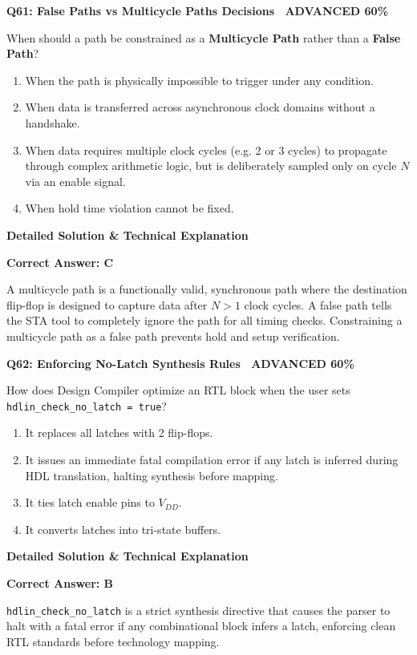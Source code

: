 \documentclass[11pt,a4paper]{article}
\newcommand{\badgeadv}{{\color{white}\colorbox{advred}{\bfseries\sffamily\tiny\ ADVANCED 60\%\ }}}
\newenvironment{qbox}[2]{%
  \begin{mdframed}[style=qstyle]%
  {\bfseries\sffamily\color{primaryblue}#1 \hfill #2}\par\vspace{2pt}%
}{%
  \end{mdframed}%
}
\newenvironment{ansbox}{%
  \begin{mdframed}[style=ansstyle]%
  {\bfseries\sffamily\color{ansgreen}\small Detailed Solution \& Technical Explanation}\par\vspace{2pt}\small%
}{%
  \end{mdframed}%
}
\begin{document}
\begin{qbox}{Q61: False Paths vs Multicycle Paths Decisions}{\badgeadv}
When should a path be constrained as a \textbf{Multicycle Path} rather than a \textbf{False Path}?
\begin{enumerate}[label=\textbf{\Alph*.}]
  \item When the path is physically impossible to trigger under any condition.
  \item When data is transferred across asynchronous clock domains without a handshake.
  \item When data requires multiple clock cycles (e.g. 2 or 3 cycles) to propagate through complex arithmetic logic, but is deliberately sampled only on cycle $N$ via an enable signal.
  \item When hold time violation cannot be fixed.
\end{enumerate}
\end{qbox}
\begin{ansbox}
\textbf{Correct Answer: C}

A multicycle path is a functionally valid, synchronous path where the destination flip-flop is designed to capture data after $N > 1$ clock cycles. A false path tells the STA tool to completely ignore the path for all timing checks. Constraining a multicycle path as a false path prevents hold and setup verification.
\end{ansbox}

\begin{qbox}{Q62: Enforcing No-Latch Synthesis Rules}{\badgeadv}
How does Design Compiler optimize an RTL block when the user sets \texttt{hdlin\_check\_no\_latch = true}?
\begin{enumerate}[label=\textbf{\Alph*.}]
  \item It replaces all latches with 2 flip-flops.
  \item It issues an immediate fatal compilation error if any latch is inferred during HDL translation, halting synthesis before mapping.
  \item It ties latch enable pins to $V_{DD}$.
  \item It converts latches into tri-state buffers.
\end{enumerate}
\end{qbox}
\begin{ansbox}
\textbf{Correct Answer: B}

\texttt{hdlin\_check\_no\_latch} is a strict synthesis directive that causes the parser to halt with a fatal error if any combinational block infers a latch, enforcing clean RTL standards before technology mapping.
\end{ansbox}
\end{document}
